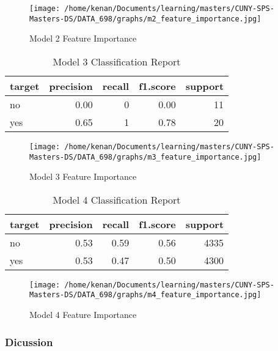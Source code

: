 \documentclass[5p]{elsarticle} %
\begin{document}
\begin{figure}
\hypertarget{id}{%
\centering
\texttt{[image: /home/kenan/Documents/learning/masters/CUNY-SPS-Masters-DS/DATA\_698/graphs/m2\_feature\_importance.jpg]}
\caption{Model 2 Feature Importance}\label{id}
}
\end{figure}

\begin{table}

\caption{\label{tab:unnamed-chunk-5}Model 3 Classification Report}
\centering
\begin{tabular}[t]{l|r|r|r|r}
\hline
target & precision & recall & f1.score & support\\
\hline
no & 0.00 & 0 & 0.00 & 11\\
\hline
yes & 0.65 & 1 & 0.78 & 20\\
\hline
\end{tabular}
\end{table}

\begin{figure}
\hypertarget{id}{%
\centering
\texttt{[image: /home/kenan/Documents/learning/masters/CUNY-SPS-Masters-DS/DATA\_698/graphs/m3\_feature\_importance.jpg]}
\caption{Model 3 Feature Importance}\label{id}
}
\end{figure}

\begin{table}

\caption{\label{tab:unnamed-chunk-6}Model 4 Classification Report}
\centering
\begin{tabular}[t]{l|r|r|r|r}
\hline
target & precision & recall & f1.score & support\\
\hline
no & 0.53 & 0.59 & 0.56 & 4335\\
\hline
yes & 0.53 & 0.47 & 0.50 & 4300\\
\hline
\end{tabular}
\end{table}

\begin{figure}
\hypertarget{id}{%
\centering
\texttt{[image: /home/kenan/Documents/learning/masters/CUNY-SPS-Masters-DS/DATA\_698/graphs/m4\_feature\_importance.jpg]}
\caption{Model 4 Feature Importance}\label{id}
}
\end{figure}

\clearpage
\twocolumn

\hypertarget{dicussion}{%
\subsubsection{Dicussion}\label{dicussion}}
\end{document}
